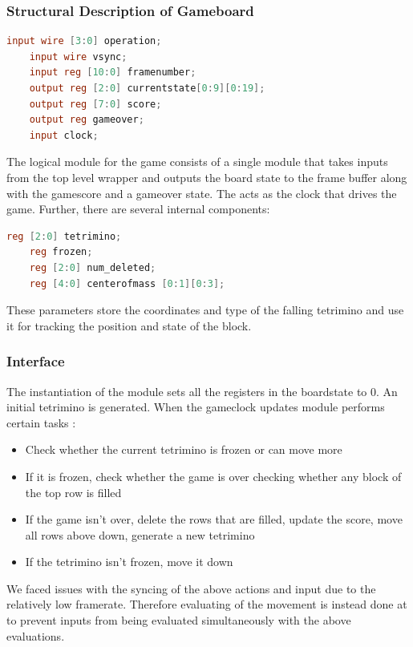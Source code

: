 \subsubsection{Structural Description of Gameboard}
\label{subsubsection:Structuraldescr}
\begin{lstlisting}[language=Verilog]
    input wire [3:0] operation;  
    input wire vsync;
    input reg [10:0] framenumber;
    output reg [2:0] currentstate[0:9][0:19];
    output reg [7:0] score;
    output reg gameover;
    input clock;
\end{lstlisting}
The logical module for the game consists of a single module that 
takes inputs from the top level wrapper and outputs the board state 
to the frame buffer along with the gamescore and a gameover state. 
The  acts as the clock that drives the game.
Further, there are several internal components:

\begin{lstlisting}[language=Verilog]
    reg [2:0] tetrimino;
    reg frozen;
    reg [2:0] num_deleted;
    reg [4:0] centerofmass [0:1][0:3];
\end{lstlisting}
These parameters store the coordinates and type of the falling 
tetrimino and use it for tracking the position and state of the block.\\

\subsubsection{Interface}
\label{subsubsection:interface}
The instantiation of the module sets all the registers in the boardstate to 0. An initial tetrimino is generated.
When the gameclock updates module performs certain tasks :
\begin{itemize}
    \item Check whether the current tetrimino is frozen or can move more
    \item If it is frozen, check whether the game is over checking whether any block of the top row is filled
    \item If the game isn't over, delete the rows that are filled, update the score, move all rows above down, generate a new tetrimino
    \item If the tetrimino isn't frozen, move it down 
\end{itemize}
We faced issues with the syncing of the above actions and input due to the relatively low framerate. 
Therefore evaluating of the movement is instead done at  to prevent inputs 
from being evaluated simultaneously with the above evaluations.
